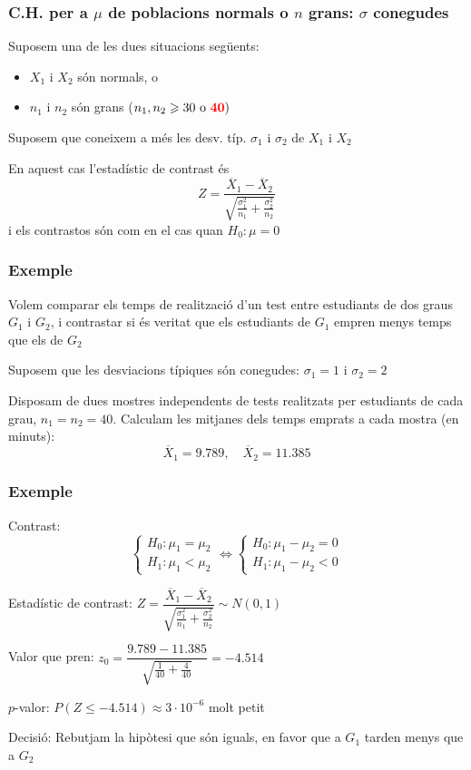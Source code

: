 \documentclass[12pt,t]{beamer}\usepackage[]{graphicx}\usepackage[]{color}
\newcommand{\red}[1]{\textcolor{red}{#1}}
\renewcommand{\emph}[1]{{\color{red}#1}}
\renewcommand{\leq}{\leqslant}
\renewcommand{\geq}{\geqslant}
\theoremstyle{plain}
\theoremstyle{definition}
\begin{document}
\begin{frame}
\frametitle{C.H. per a $\mu$ de  poblacions normals o $n$ grans: $\sigma$ conegudes}

Suposem una de les dues situacions següents:
\begin{itemize}
\item $X_1$ i $X_2$ són normals, o

\item $n_1$ i $n_2$ són grans ($n_1,n_2\geq 30\mbox{ o } \red{\bf 40})$
\end{itemize}
\medskip

Suposem que coneixem a més les desv. típ. $\sigma_1$ i $\sigma_2$ de $X_1$ i $X_2$
\medskip

En aquest cas l'estadístic de contrast és
$$
Z=\frac{\overline{X}_1-\overline{X}_2}{\sqrt{\frac{\sigma_1^2}{n_1}+\frac{\sigma_2^2}{n_2}}}
$$
i els contrastos són com en el cas quan $H_0:\mu=0$
\end{frame}

\begin{frame}
\frametitle{Exemple}

Volem comparar els temps de realització d'un test entre estudiants de dos graus $G_1$ i $G_2$, i contrastar si és veritat que els estudiants de $G_1$ empren menys temps que els de $G_2$
\medskip

Suposem que les desviacions típiques són conegudes: $\sigma_1=1$ i $\sigma_2=2$
\medskip

Disposam de dues mostres independents de tests realitzats per estudiants de cada grau, $n_1=n_2=40$. Calculam les mitjanes dels temps emprats a cada mostra (en minuts):
$$
\overline{X}_1= 9.789,\quad  \overline{X}_2=11.385
$$

\end{frame}




\begin{frame}
\frametitle{Exemple}

\emph{Contrast}:
$$
\left\{\begin{array}{l}
H_0:\mu_1=\mu_2\\
H_1:\mu_1< \mu_2
\end{array}\right.
\Longleftrightarrow
\left\{\begin{array}{l}
H_0:\mu_1-\mu_2=0\\
H_1:\mu_1- \mu_2<0
\end{array}\right.
$$

\emph{Estadístic de contrast}: $Z=\dfrac{\overline{X}_1-\overline{X}_2}{\sqrt{\frac{\sigma_1^2}{n_1}+\frac{\sigma_2^2}{n_2}}}\sim N(0,1)$
\medskip

\emph{Valor que pren}: $z_0=\dfrac{9.789-11.385}{\sqrt{\frac{1}{40}+\frac{4}{40}}}=-4.514$
\medskip

\emph{$p$-valor}: $P(Z\leq -4.514)\approx 3\cdot 10^{-6}$ molt petit
\medskip

\emph{Decisió}: Rebutjam la hipòtesi que són iguals, en favor que a $G_1$ tarden menys que a $G_2$
\end{frame}
\end{document}
